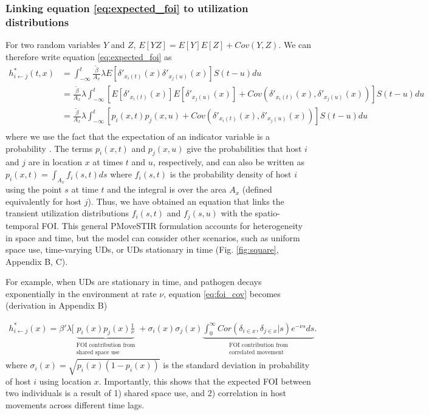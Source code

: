 ﻿\documentclass[11pt]{article}
\begin{document}
\subsubsection*{Linking equation \ref{eq:expected_foi} to utilization distributions}

For two random variables $Y$ and $Z$, $E[YZ] = E[Y]E[Z] + Cov(Y, Z)$.  We can therefore write equation \ref{eq:expected_foi} as
\begin{equation}
    \begin{aligned}
        h^*_{i \leftarrow j}(t, x) &= \int_{-\infty}^{t} \frac{\tilde{\beta}}{A_x} \lambda E[\delta'_{x_i(t)}(x) \delta'_{x_j(u)}(x)] S(t - u) du \\
        &= \frac{\tilde{\beta}}{A_x} \lambda \int_{-\infty}^{t} [E[\delta'_{x_i(t)}(x)] E[\delta'_{x_j(u)}(x)] + Cov(\delta'_{x_i(t)}(x), \delta'_{x_j(u)}(x))] S(t - u) du \\
        &= \frac{\tilde{\beta}}{A_x} \lambda \int_{-\infty}^{t} [p_i(x, t) p_j(x, u) + Cov(\delta'_{x_i(t)}(x), \delta'_{x_j(u)}(x))] S(t - u) du \\
    \end{aligned}
    \label{eq:foi_cov}
\end{equation}
where we use the fact that the expectation of an indicator variable is a probability \citep{Grimmett2001}. The terms $p_i(x, t)$ and $p_j(x,u)$ give the probabilities that host $i$ and $j$ are in location $x$ at times $t$ and $u$, respectively, and can also be written as $p_i(x, t) = \int_{A_x} f_i(s, t) ds$ where $f_i(s, t)$ is the probability density of host $i$ using the point $s$ at time $t$ and the integral is over the area $A_x$ (defined equivalently for host $j$). Thus, we have obtained an equation that links the transient utilization distributions $f_i(s, t)$ and $f_j(s, u)$ with the spatio-temporal FOI.
This general PMoveSTIR formulation accounts for heterogeneity in space and time, but the model can consider other scenarios, such as uniform space use, time-varying UDs, or UDs stationary in time (Fig. \ref{fig:square}, Appendix B, C). 

For example, when UDs are stationary in time, and pathogen decays exponentially in the environment at rate $\nu$, equation \ref{eq:foi_cov} becomes (derivation in Appendix B)

\begin{equation}
    \begin{aligned}
    h^*_{i \leftarrow j}(x) = \beta' \lambda [ \underbrace{p_i(x)p_j(x) \frac{1}{\nu}}_{\substack{\text{FOI contribution from} \\ \text{shared space use}}} + \sigma_i(x) \sigma_j(x) \underbrace{\int_{0}^{\infty} Cor(\delta_{i \in x}, \delta_{j \in x} | s) e^{-\nu s} ds}_{\substack{\text{FOI contribution from} \\ \text{correlated movement}}}.
    \end{aligned}
    \label{eq:stationary_cor}
\end{equation}
where $\sigma_i(x) = \sqrt{p_i(x)(1 - p_i(x))}$  is the standard deviation in probability of host $i$ using location $x$.  Importantly, this shows that the expected FOI between two individuals is a result of 1) shared space use, and 2) correlation in host movements across different time lags.  
\end{document}

